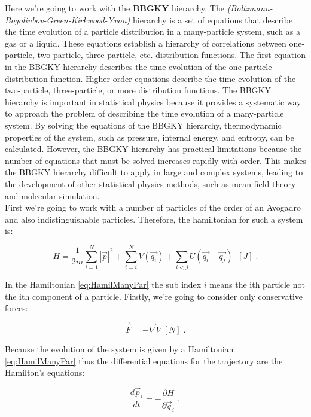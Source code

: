 \documentclass[spanish,notitlepage,letterpaper,11pt]{article} %
\numberwithin{equation}{subsection}
\begin{document}
        Here we're going to work with the \textbf{BBGKY} hierarchy. The \textit{ (Boltzmann-Bogoliubov-Green-Kirkwood-Yvon)} hierarchy is a set of equations that describe the time evolution of a particle distribution in a many-particle system, such as a gas or a liquid. These equations establish a hierarchy of correlations between one-particle, two-particle, three-particle, etc. distribution functions. The first equation in the BBGKY hierarchy describes the time evolution of the one-particle distribution function. Higher-order equations describe the time evolution of the two-particle, three-particle, or more distribution functions. The BBGKY hierarchy is important in statistical physics because it provides a systematic way to approach the problem of describing the time evolution of a many-particle system. By solving the equations of the BBGKY hierarchy, thermodynamic properties of the system, such as pressure, internal energy, and entropy, can be calculated. However, the BBGKY hierarchy has practical limitations because the number of equations that must be solved increases rapidly with order. This makes the BBGKY hierarchy difficult to apply in large and complex systems, leading to the development of other statistical physics methods, such as mean field theory and molecular simulation.\\

        First we're going to work with a number of particles of the order of an Avogadro and also indistinguishable particles. Therefore, the hamiltonian for such a system is:

        \begin{equation}\label{eq:HamilManyPar}
            H = \frac{1}{2m}\sum_{i = 1}^N |\Vec{p}|^2 + \sum_{i=i}^N V(\Vec{q_i}) + \sum_{i<j}U(\Vec{q_i}- \Vec{q_j})\;\;[J]\;.
        \end{equation}

        In the Hamiltonian \ref{eq:HamilManyPar} the sub index $i$ means the ith particle not the ith component of a particle. Firstly, we're going to consider only conservative forces:

        \begin{equation}
            \Vec{F} = -\Vec{\nabla}V \;[N]\;.
        \end{equation}

        Because the evolution of the system is given by a Hamiltonian \ref{eq:HamilManyPar} thus the differential equations for the trajectory are the Hamilton's equations:

        \begin{equation}
            \frac{d \Vec{p}_i}{dt} = -\frac{\partial H}{\partial \Vec{q}_i}\;,
        \end{equation}
\end{document}
